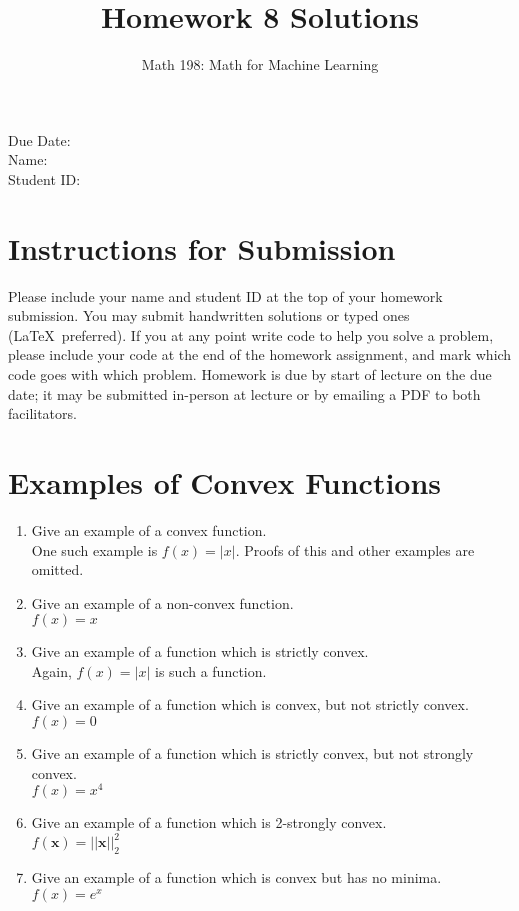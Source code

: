 \documentclass{article}
\title{Homework 8 Solutions}
\author{Math 198: Math for Machine Learning}
\date{}
\begin{document}
\maketitle

\noindent
Due Date:  \\
Name: \\
Student ID:

\section*{Instructions for Submission}
Please include your name and student ID at the top of your homework submission. You may submit handwritten solutions or typed ones (\LaTeX\ preferred). If you at any point write code to help you solve a problem, please include your code at the end of the homework assignment, and mark which code goes with which problem. Homework is due by start of lecture on the due date; it may be submitted in-person at lecture or by emailing a PDF to both facilitators.

\section{Examples of Convex Functions}
\begin{enumerate}[label=\arabic*.]
\item Give an example of a convex function. \\
{\color{blue} One such example is $f(x) = |x|$. Proofs of this and other examples are omitted.}
\item Give an example of a non-convex function. \\
{\color{blue} $f(x) = x$}
\item Give an example of a function which is strictly convex. \\
{\color{blue} Again, $f(x) = |x|$ is such a function.}
\item Give an example of a function which is convex, but not strictly convex. \\
{\color{blue} $f(x) = 0$}
\item Give an example of a function which is strictly convex, but not strongly convex. \\
{\color{blue} $f(x) = x^4$}
\item Give an example of a function which is 2-strongly convex. \\
{\color{blue} $f(\mathbf{x}) = ||\mathbf{x}||_2^2$}
\item Give an example of a function which is convex but has no minima. \\
{\color{blue} $f(x) = e^x$}
\end{enumerate}
\end{document}
